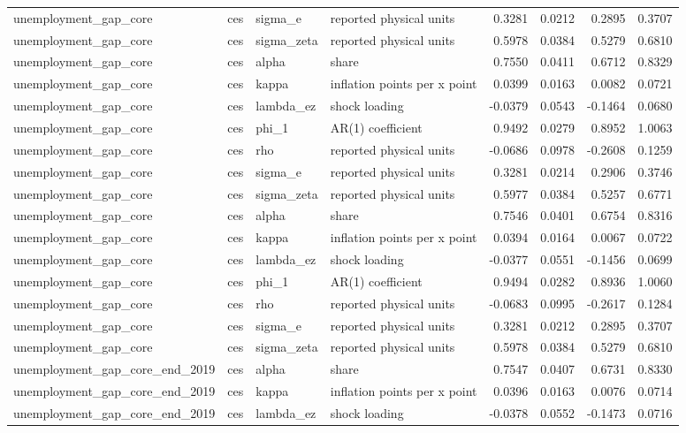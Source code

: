\begin{tabular}{llllrrrr}
unemployment\_gap\_core & ces & sigma\_e & reported physical units & 0.3281 & 0.0212 & 0.2895 & 0.3707 \\
unemployment\_gap\_core & ces & sigma\_zeta & reported physical units & 0.5978 & 0.0384 & 0.5279 & 0.6810 \\
unemployment\_gap\_core & ces & alpha & share & 0.7550 & 0.0411 & 0.6712 & 0.8329 \\
unemployment\_gap\_core & ces & kappa & inflation points per x point & 0.0399 & 0.0163 & 0.0082 & 0.0721 \\
unemployment\_gap\_core & ces & lambda\_ez & shock loading & -0.0379 & 0.0543 & -0.1464 & 0.0680 \\
unemployment\_gap\_core & ces & phi\_1 & AR(1) coefficient & 0.9492 & 0.0279 & 0.8952 & 1.0063 \\
unemployment\_gap\_core & ces & rho & reported physical units & -0.0686 & 0.0978 & -0.2608 & 0.1259 \\
unemployment\_gap\_core & ces & sigma\_e & reported physical units & 0.3281 & 0.0214 & 0.2906 & 0.3746 \\
unemployment\_gap\_core & ces & sigma\_zeta & reported physical units & 0.5977 & 0.0384 & 0.5257 & 0.6771 \\
unemployment\_gap\_core & ces & alpha & share & 0.7546 & 0.0401 & 0.6754 & 0.8316 \\
unemployment\_gap\_core & ces & kappa & inflation points per x point & 0.0394 & 0.0164 & 0.0067 & 0.0722 \\
unemployment\_gap\_core & ces & lambda\_ez & shock loading & -0.0377 & 0.0551 & -0.1456 & 0.0699 \\
unemployment\_gap\_core & ces & phi\_1 & AR(1) coefficient & 0.9494 & 0.0282 & 0.8936 & 1.0060 \\
unemployment\_gap\_core & ces & rho & reported physical units & -0.0683 & 0.0995 & -0.2617 & 0.1284 \\
unemployment\_gap\_core & ces & sigma\_e & reported physical units & 0.3281 & 0.0212 & 0.2895 & 0.3707 \\
unemployment\_gap\_core & ces & sigma\_zeta & reported physical units & 0.5978 & 0.0384 & 0.5279 & 0.6810 \\
unemployment\_gap\_core\_end\_2019 & ces & alpha & share & 0.7547 & 0.0407 & 0.6731 & 0.8330 \\
unemployment\_gap\_core\_end\_2019 & ces & kappa & inflation points per x point & 0.0396 & 0.0163 & 0.0076 & 0.0714 \\
unemployment\_gap\_core\_end\_2019 & ces & lambda\_ez & shock loading & -0.0378 & 0.0552 & -0.1473 & 0.0716 \\

\end{tabular}
